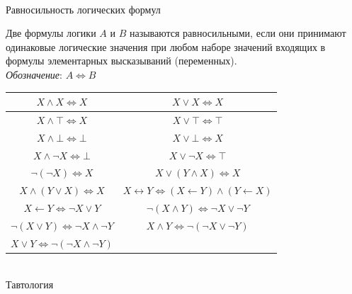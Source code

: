 \begin{frame}{\\Равносильность логических формул}
	\topline
	\justifying
	\\
	\footnotesize{
		Две формулы логики $A$ и $B$ называются равносильными, если они принимают одинаковые логические значения при любом наборе значений входящих в формулы элементарных высказываний (переменных).\\
		\textit{Обозначение}: $A \iff B$
		\begin{center}
			\begin{tabular}{|c|c|}
				\hline
				$X \land X \iff X$ & $X \lor X \iff X$\\
				\hline
				$X \land \top \iff X$ & $X \lor \top \iff \top$\\
				\hline
				$X \land \bot \iff \bot$ & $X \lor \bot \iff X$\\
				\hline
				$X \land \neg X \iff \bot$ & $X \lor \neg X \iff \top$\\
				\hline
				$\neg(\neg X) \iff X$ & $X \lor (Y \land X) \iff X$\\
				\hline
				$X \land (Y \lor X) \iff X$ & $X \leftrightarrow Y \iff (X \leftarrow Y) \land (Y \leftarrow X)$\\
				\hline
				$X \leftarrow Y \iff \neg X \lor Y$ & $\neg(X \land Y) \iff \neg X \lor \neg Y$\\
				\hline
				$\neg(X \lor Y) \iff \neg X \land \neg Y$ & $X \land Y \iff \neg(\neg X \lor \neg Y)$\\
				\hline
				$X \lor Y \iff \neg(\neg X \land \neg Y)$ &\\
				\hline
			\end{tabular}
		\end{center}
	}
\end{frame}

\begin{frame}{\\Тавтология}
	\topline
	\justifying
	\begin{SCn}
	\end{SCn}
\end{frame}

